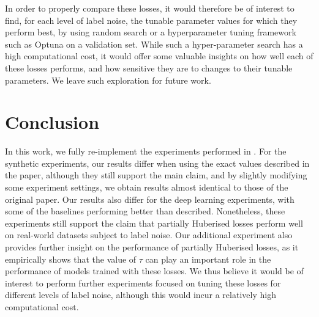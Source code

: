 In order to properly compare these losses, it would therefore be of interest to find, for each level of label noise, the tunable parameter values for which they perform best, by using random search or a hyperparameter tuning framework such as Optuna \citep{akiba2019optuna} on a validation set. While such a hyper-parameter search has a high computational cost, it would offer some valuable insights on how well each of these losses performs, and how sensitive they are to changes to their tunable parameters. We leave such exploration for future work.


\section{Conclusion}
\label{sec:conclusion}

In this work, we fully re-implement the experiments performed in \citet{menon_can_2019}. For the synthetic experiments, our results differ when using the exact values described in the paper, although they still support the main claim, and by slightly modifying some experiment settings, we obtain results almost identical to those of the original paper. Our results also differ for the deep learning experiments, with some of the baselines performing better than described. Nonetheless, these experiments still support the claim that partially Huberised losses perform well on real-world datasets subject to label noise. Our additional experiment also provides further insight on the performance of partially Huberised losses, as it empirically shows that the value of $\tau$ can play an important role in the performance of models trained with these losses. We thus believe it would be of interest to perform further experiments focused on tuning these losses for different levels of label noise, although this would incur a relatively high computational cost. 
